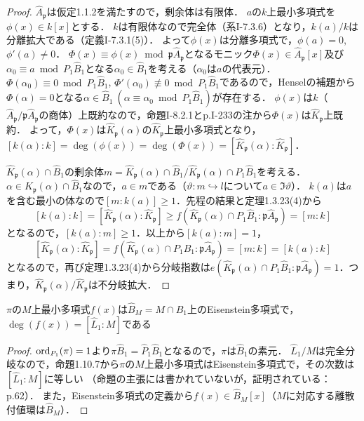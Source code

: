 \begin{proof}
  $\widehat{A}_\mathfrak{p}$は仮定1.1.2を満たすので，剰余体は有限体．
  $a$の$k$上最小多項式を$\phi(x)\in k[x]$とする．
  $k$は有限体なので完全体（系I-7.3.6）となり，$k(a)/k$は分離拡大である（定義I-7.3.1(5)）．
  よって$\phi(x)$は分離多項式で，$\phi(a)=0$, $\phi'(a)\neq0$．
  $\Phi(x)\equiv\phi(x)\bmod\mathfrak{p}\widehat{A}_\mathfrak{p}$となるモニック$\Phi(x)\in\widehat{A}_\mathfrak{p}[x]$及び$\alpha_0\equiv a\bmod P_1\widehat{B}_1$となる$\alpha_0\in\widehat{B}_1$を考える（$\alpha_0$は$a$の代表元）．
  $\Phi(\alpha_0)\equiv 0\bmod P_1\widehat{B}_1$, $\Phi'(\alpha_0)\not\equiv 0\bmod P_1\widehat{B}_1$であるので，Henselの補題から$\Phi(\alpha)=0$となる$\alpha\in\widehat{B}_1\ (\alpha\equiv\alpha_0\bmod P_1\widehat{B}_1)$が存在する．
  $\phi(x)$は$k$（$\widehat{A}_\mathfrak{p}/\mathfrak{p}\widehat{A}_\mathfrak{p}$の商体）上既約なので，命題I-8.2.1とp.I-233の注から$\Phi(x)$は$\widehat{K}_\mathfrak{p}$上既約．
  よって，$\Phi(x)$は$\widehat{K}_\mathfrak{p}(\alpha)$の$\widehat{K}_\mathfrak{p}$上最小多項式となり，$[k(\alpha):k]=\deg (\phi(x))=\deg (\Phi(x))=[\widehat{K}_\mathfrak{p}(\alpha):\widehat{K}_\mathfrak{p}]$．

  $\widehat{K}_\mathfrak{p}(\alpha)\cap\widehat{B}_1$の剰余体$m=\widehat{K}_\mathfrak{p}(\alpha)\cap\widehat{B}_1/\widehat{K}_\mathfrak{p}(\alpha)\cap P_1\widehat{B}_1$を考える．
  $\alpha\in\widehat{K}_\mathfrak{p}(\alpha)\cap\widehat{B}_1$なので，$a\in m$である（$\vartheta\colon m \hookrightarrow l$について$a \in \Im \vartheta$）．
  $k(a)$は$a$を含む最小の体なので$[m:k(a)]\geq 1$．先程の結果と定理1.3.23(4)から
  \[[k(a):k]=[\widehat{K}_\mathfrak{p}(\alpha):\widehat{K}_\mathfrak{p}]\geq f(\widehat{K}_\mathfrak{p}(\alpha)\cap P_1\widehat{B}_1:\mathfrak{p}\widehat{A}_\mathfrak{p})=[m:k]\]
  となるので，$[k(a):m]\geq 1$．以上から$[k(a):m]=1$，
  \[[\widehat{K}_\mathfrak{p}(\alpha):\widehat{K}_\mathfrak{p}]=f(\widehat{K}_\mathfrak{p}(\alpha)\cap P_1\widehat{B}_1:\mathfrak{p}\widehat{A}_\mathfrak{p})=[m:k]=[k(a):k]\]
  となるので，再び定理1.3.23(4)から分岐指数は$e(\widehat{K}_\mathfrak{p}(\alpha)\cap P_1\widehat{B}_1:\mathfrak{p}\widehat{A}_\mathfrak{p})=1$．つまり，$\widehat{K}_\mathfrak{p}(\alpha)/\widehat{K}_\mathfrak{p}$は不分岐拡大．
\end{proof}

\begin{screen}
  $\pi$の$M$上最小多項式$f(x)$は$\widehat{B}_M = M\cap\widehat{B}_1$上のEisenstein多項式で，$\deg (f(x))=[\widehat{L}_1:M]$である
\end{screen}
\begin{proof}
  $\operatorname{ord}_{P_1}(\pi)=1$より$\pi\widehat{B}_1=\widehat{P}_1\widehat{B}_1$となるので，$\pi$は$\widehat{B}_1$の素元．
  $\widehat{L}_1/M$は完全分岐なので，命題1.10.7から$\pi$の$M$上最小多項式はEisenstein多項式で，その次数は$[\widehat{L}_1:M]$に等しい
  （命題の主張には書かれていないが，証明されている：p.62）．
  また，Eisenstein多項式の定義から$f(x)\in\widehat{B}_M[x]$（$M$に対応する離散付値環は$\widehat{B}_M$）．
\end{proof}

